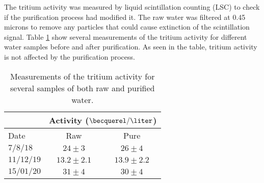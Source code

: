 The tritium activity was measured by liquid scintillation counting (LSC) to check if the purification process had modified it. The raw water was filtered at 0.45 microns to remove any particles that could cause extinction of the scintillation signal. Table \ref{tab:ActivityTritiumValues} show several measurements of the tritium activity for different water samples before and after purification. As seen in the table, tritium activity is not affected by the purification process.

\begin{table}[htbp]
\centering{}%
\begin{tabular}{lcc}
\toprule 
& \multicolumn{2}{c}{Activity ($\becquerel/\liter$)} \tabularnewline
\midrule
Date & Raw & Pure \tabularnewline
\midrule
\midrule 
$7/8/18$ & $24 \pm 3$ & $26 \pm 4$ \tabularnewline
$11/12/19$ & $13.2 \pm 2.1$ & $13.9 \pm 2.2$ \tabularnewline
$15/01/20$ & $31 \pm 4$ & $30 \pm 4$ \tabularnewline
\bottomrule
\end{tabular}
\caption{Measurements of the tritium activity for several samples of both raw and purified water.}
\label{tab:ActivityTritiumValues}
\end{table}

